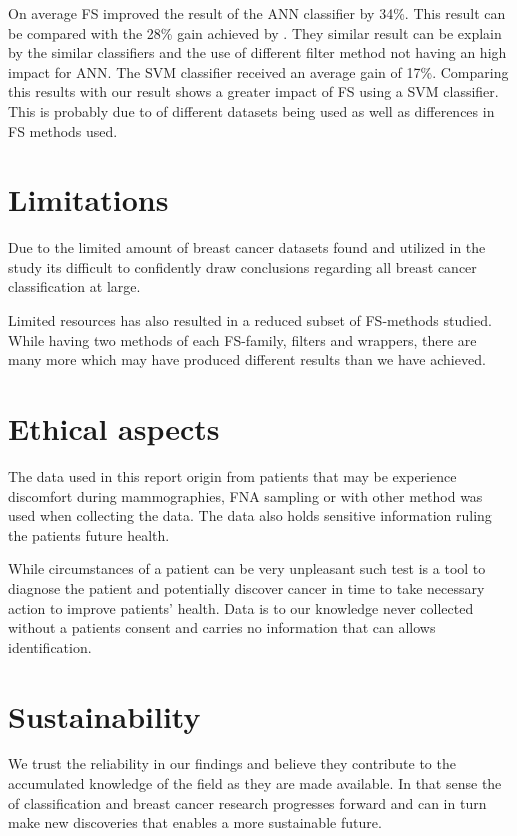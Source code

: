On average FS improved the result of the ANN classifier by 34\%. This result can be compared with the 28\% gain achieved by \textcite{karabulut2012}. They similar result can be explain by the similar classifiers and the use of different filter method not having an high impact for ANN. The SVM classifier received an average gain of 17\%. Comparing this results with \textcite{b20103177} our result shows a greater impact of FS using a SVM classifier. This is probably due to of different datasets being used as well as differences in FS methods used.

\section{Limitations}

Due to the limited amount of breast cancer datasets found and utilized in the study its difficult to confidently draw conclusions regarding all breast cancer classification at large.

Limited resources has also resulted in a reduced subset of FS-methods studied. While having two methods of each FS-family, filters and wrappers, there are many more which may have produced different results than we have achieved.


\section{Ethical aspects}

The data used in this report origin from patients that may be experience discomfort during mammographies, FNA sampling or with other method was used when collecting the data. The data also holds sensitive information ruling the patients future health.

While circumstances of a patient can be very unpleasant such test is a tool to diagnose the patient and potentially discover cancer in time to take necessary action to improve patients' health. Data is to our knowledge never collected without a patients consent and carries no information that can allows identification.

\section{Sustainability}

We trust the reliability in our findings and believe they contribute to the accumulated knowledge of the field as they are made available. In that sense the of classification and breast cancer research progresses forward and can in turn make new discoveries that enables a more sustainable future.
